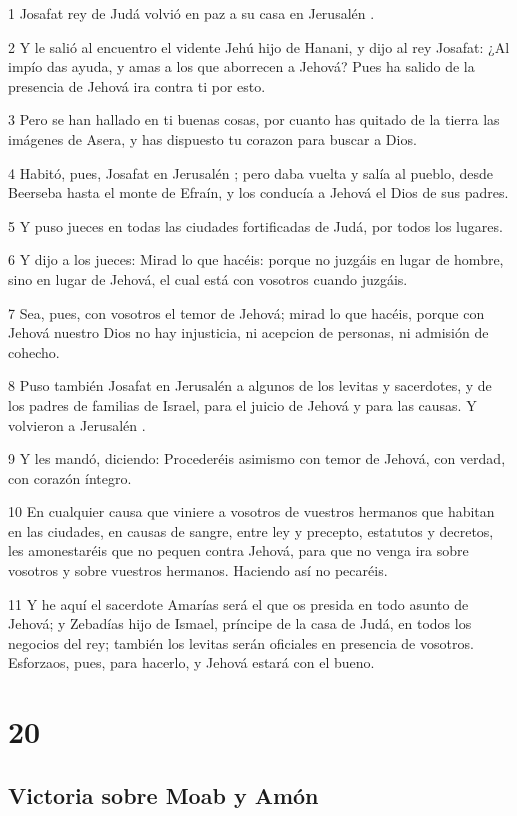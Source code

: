 \par 1 Josafat rey de Judá volvió en paz a su casa en Jerusalén .
\par 2 Y le salió al encuentro el vidente Jehú hijo de Hanani, y dijo al rey Josafat: ¿Al impío das ayuda, y amas a los que aborrecen a Jehová? Pues ha salido de la presencia de Jehová ira contra ti por esto.
\par 3 Pero se han hallado en ti buenas cosas, por cuanto has quitado de la tierra las imágenes de Asera, y has dispuesto tu corazon para buscar a Dios.
\par 4 Habitó, pues, Josafat en Jerusalén ; pero daba vuelta y salía al pueblo, desde Beerseba hasta el monte de Efraín, y los conducía a Jehová el Dios de sus padres.
\par 5 Y puso jueces en todas las ciudades fortificadas de Judá, por todos los lugares.
\par 6 Y dijo a los jueces: Mirad lo que hacéis: porque no juzgáis en lugar de hombre, sino en lugar de Jehová, el cual está con vosotros cuando juzgáis.
\par 7 Sea, pues, con vosotros el temor de Jehová; mirad lo que hacéis, porque con Jehová nuestro Dios no hay injusticia, ni acepcion de personas, ni admisión de cohecho.
\par 8 Puso también Josafat en Jerusalén a algunos de los levitas y sacerdotes, y de los padres de familias de Israel, para el juicio de Jehová y para las causas. Y volvieron a Jerusalén .
\par 9 Y les mandó, diciendo: Procederéis asimismo con temor de Jehová, con verdad,  con corazón íntegro.
\par 10 En cualquier causa que viniere a vosotros de vuestros hermanos que habitan en las ciudades, en causas de sangre, entre ley y precepto, estatutos y decretos, les amonestaréis que no pequen contra Jehová, para que no venga ira sobre vosotros y sobre vuestros hermanos. Haciendo así no pecaréis.
\par 11 Y he aquí el sacerdote Amarías será el que os presida en todo asunto de Jehová; y Zebadías hijo de Ismael, príncipe de la casa de Judá, en todos los negocios del rey; también los levitas serán oficiales en presencia de vosotros. Esforzaos, pues, para hacerlo, y Jehová estará con el bueno.

\chapter{20}

\section*{Victoria sobre Moab y Amón}


